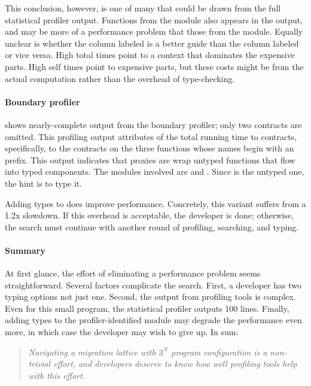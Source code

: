 This conclusion, however, is one of many that could be drawn from the full
statistical profiler output.  Functions from the  module also appears in the output,
and may be more of a performance problem that those from the  module.  Equally
unclear is whether the column labeled  is a better guide than
the column labeled  or vice versa.  High
total times point to a context that dominates the expensive parts.  High self
times point to expensive parts, but these costs might be from the actual
computation rather than the overhead of type-checking.

\paragraph{Boundary profiler}  shows nearly-complete
output from the boundary profiler; only two contracts are omitted.  This
profiling output attributes  of the total running time to
contracts, specifically, to the contracts on the three functions whose names
begin with an  prefix.
This output indicates that proxies are
wrap untyped functions that flow into typed components. The modules involved are
 and .  Since  is the untyped one, the hint is to
type it.

Adding types to  does improve performance. Concretely, this variant
suffers from a 1.2x slowdown.  If this overhead is acceptable, the developer is
done; otherwise, the search must continue with another round of
profiling, searching, and typing.


\paragraph{Summary}

At first glance, the effort of eliminating a performance problem seems
straightforward. Several factors complicate the search. First, a
developer has two typing options not just one. Second, the output from
profiling tools is complex. Even for this small program, the statistical
profiler outputs 100 lines.
Finally, adding types to the
profiler-identified module may degrade the performance even more, in which case
the developer may wish to give up. In sum:

\begin{quote} \em
Navigating a migration lattice with
$3^N$ program configuration is a non-trivial effort, and developers deserve to
know how well profiling tools help with this effort.
\end{quote}

